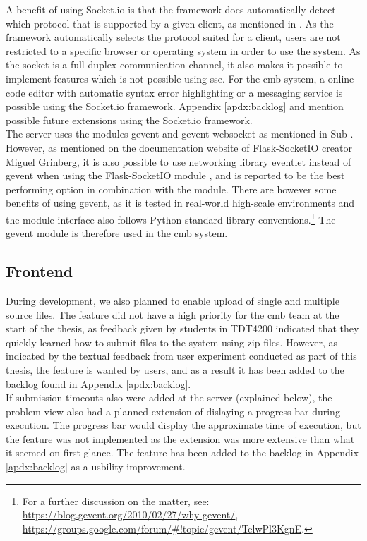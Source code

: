 A benefit of using Socket.io is that the framework does automatically detect which protocol that is supported by a given client, as mentioned in . As the framework automatically selects the protocol suited for a client, users are not restricted to a specific browser or operating system in order to use the system. As the socket is a full-duplex communication channel, it also makes it possible to implement features which is not possible using \gls{sse}. For the \gls{cmb} system, a online code editor with automatic syntax error highlighting or a messaging service is possible using the Socket.io framework. Appendix \ref{apdx:backlog} and  mention possible future extensions using the Socket.io framework. \\

The server uses the modules gevent \cite{GEVENT} and gevent-websocket \cite{GEVENTWEBSOCKET} as mentioned in Sub-. However, as mentioned on the documentation website of Flask-SocketIO creator Miguel Grinberg, it is also possible to use networking library eventlet \cite{EVENTLET} instead of gevent when using the Flask-SocketIO module \cite{FLASKSOCKETIO}, and is reported to be the best performing option in combination with the module. There are however some benefits of using gevent, as it is tested in real-world high-scale environments and the module interface also follows Python standard library conventions.\footnote{For a further discussion on the matter, see: \url{https://blog.gevent.org/2010/02/27/why-gevent/}, \url{https://groups.google.com/forum/\#!topic/gevent/TelwPl3KgnE}.} The gevent module is therefore used in the \gls{cmb} system.

\subsection{Frontend}
During development, we also planned to enable upload of single and multiple source files. The feature did not have a high priority for the \gls{cmb} team at the start of the thesis, as feedback given by students in TDT4200 indicated that they quickly learned how to submit files to the system using zip-files. However, as indicated by the textual feedback from user experiment conducted as part of this thesis, the feature is wanted by users, and as a result it has been added to the backlog found in Appendix \ref{apdx:backlog}. \\

If submission timeouts also were added at the server (explained below), the problem-view also had a planned extension of dislaying a progress bar during execution. The progress bar would display the approximate time of execution, but the feature was not implemented as the extension was more extensive than what it seemed on first glance. The feature has been added to the backlog in Appendix \ref{apdx:backlog} as a usbility improvement.

